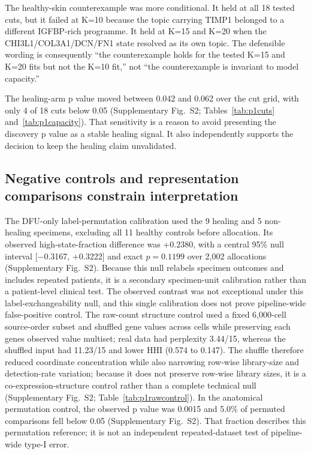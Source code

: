 \documentclass[10pt,a4paper]{article}
\begin{document}
The healthy-skin counterexample was more conditional. It held at all 18 tested cuts, but it failed at K=10 because the topic carrying TIMP1 belonged to a different IGFBP-rich programme. It held at K=15 and K=20 when the CHI3L1/COL3A1/DCN/FN1 state resolved as its own topic. The defensible wording is consequently ``the counterexample holds for the tested K=15 and K=20 fits but not the K=10 fit,'' not ``the counterexample is invariant to model capacity.''

The healing-arm p value moved between 0.042 and 0.062 over the cut grid, with only 4 of 18 cuts below 0.05 (Supplementary Fig.~S2; Tables~\ref{tab:p1cuts} and~\ref{tab:p1capacity}). That sensitivity is a reason to avoid presenting the discovery p value as a stable healing signal. It also independently supports the decision to keep the healing claim unvalidated.

\subsection{Negative controls and representation comparisons constrain interpretation}

The DFU-only label-permutation calibration used the 9 healing and 5 non-healing specimens, excluding all 11 healthy controls before allocation. Its observed high-state-fraction difference was +0.2380, with a central 95\% null interval {[}−0.3167, +0.3222{]} and exact $p=0.1199$ over 2,002 allocations (Supplementary Fig.~S2). Because this null relabels specimen outcomes and includes repeated patients, it is a secondary specimen-unit calibration rather than a patient-level clinical test. The observed contrast was not exceptional under this label-exchangeability null, and this single calibration does not prove pipeline-wide false-positive control. The raw-count structure control used a fixed 6,000-cell source-order subset and shuffled gene values across cells while preserving each gene\textquotesingle{}s observed value multiset; real data had perplexity 3.44/15, whereas the shuffled input had 11.23/15 and lower HHI (0.574 to 0.147). The shuffle therefore reduced coordinate concentration while also narrowing row-wise library-size and detection-rate variation; because it does not preserve row-wise library sizes, it is a co-expression-structure control rather than a complete technical null (Supplementary Fig.~S2; Table~\ref{tab:p1rawcontrol}). In the anatomical permutation control, the observed p value was 0.0015 and 5.0\% of permuted comparisons fell below 0.05 (Supplementary Fig.~S2). That fraction describes this permutation reference; it is not an independent repeated-dataset test of pipeline-wide type-I error.
\end{document}
